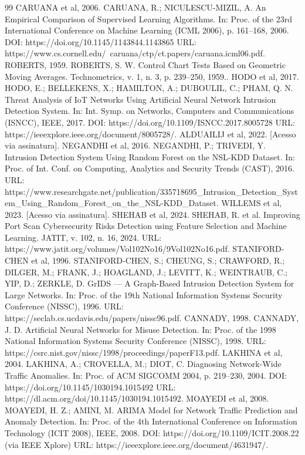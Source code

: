 \documentclass[12pt,a4paper]{article}
\begin{document}
\begin{thebibliography}{99}
 CARUANA et al, 2006. CARUANA, R.; NICULESCU-MIZIL, A. An Empirical Comparison of Supervised Learning Algorithms. In: Proc. of the 23rd International Conference on Machine Learning (ICML 2006), p. 161–168, 2006. DOI: https://doi.org/10.1145/1143844.1143865 URL: https://www.cs.cornell.edu/~caruana/ctp/ct.papers/caruana.icml06.pdf.
 ROBERTS, 1959. ROBERTS, S. W. Control Chart Tests Based on Geometric Moving Averages. Technometrics, v. 1, n. 3, p. 239–250, 1959..
 HODO et al, 2017. HODO, E.; BELLEKENS, X.; HAMILTON, A.; DUBOULIL, C.; PHAM, Q. N. Threat Analysis of IoT Networks Using Artificial Neural Network Intrusion Detection System. In: Int. Symp. on Networks, Computers and Communications (ISNCC), IEEE, 2017. DOI: https://doi.org/10.1109/ISNCC.2017.8005728 URL: https://ieeexplore.ieee.org/document/8005728/.
 ALDUAILIJ et al, 2022. [Acesso via assinatura].
 NEGANDHI et al, 2016. NEGANDHI, P.; TRIVEDI, Y. Intrusion Detection System Using Random Forest on the NSL-KDD Dataset. In: Proc. of Int. Conf. on Computing, Analytics and Security Trends (CAST), 2016. URL: https://www.researchgate.net/publication/335718695_Intrusion_Detection_System_Using_Random_Forest_on_the_NSL-KDD_Dataset.
 WILLEMS et al, 2023. [Acesso via assinatura].
 SHEHAB et al, 2024. SHEHAB, R. et al. Improving Port Scan Cybersecurity Risks Detection using Feature Selection and Machine Learning. JATIT, v. 102, n. 16, 2024. URL: https://www.jatit.org/volumes/Vol102No16/9Vol102No16.pdf.
 STANIFORD-CHEN et al, 1996. STANIFORD-CHEN, S.; CHEUNG, S.; CRAWFORD, R.; DILGER, M.; FRANK, J.; HOAGLAND, J.; LEVITT, K.; WEINTRAUB, C.; YIP, D.; ZERKLE, D. GrIDS — A Graph-Based Intrusion Detection System for Large Networks. In: Proc. of the 19th National Information Systems Security Conference (NISSC), 1996. URL: https://seclab.cs.ucdavis.edu/papers/nissc96.pdf.
 CANNADY, 1998. CANNADY, J. D. Artificial Neural Networks for Misuse Detection. In: Proc. of the 1998 National Information Systems Security Conference (NISSC), 1998. URL: https://csrc.nist.gov/nissc/1998/proceedings/paperF13.pdf.
 LAKHINA et al, 2004. LAKHINA, A.; CROVELLA, M.; DIOT, C. Diagnosing Network-Wide Traffic Anomalies. In: Proc. of ACM SIGCOMM 2004, p. 219–230, 2004. DOI: https://doi.org/10.1145/1030194.1015492 URL: https://dl.acm.org/doi/10.1145/1030194.1015492.
 MOAYEDI et al, 2008. MOAYEDI, H. Z.; AMINI, M. ARIMA Model for Network Traffic Prediction and Anomaly Detection. In: Proc. of the 4th International Conference on Information Technology (ICIT 2008), IEEE, 2008. DOI: https://doi.org/10.1109/ICIT.2008.22 (via IEEE Xplore) URL: https://ieeexplore.ieee.org/document/4631947/.

\end{thebibliography}
\end{document}
